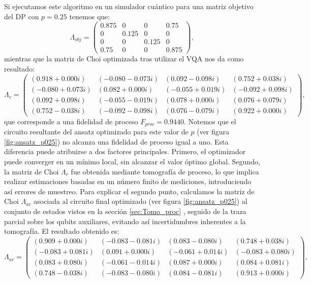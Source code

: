 \documentclass[letterpaper,12pt]{thesisECFM}
\theoremstyle{plain}
\theoremstyle{definition}
\theoremstyle{definition}
\theoremstyle{remark}
\newcommand{\1}{\mathbb{1}}
\begin{document}
Si ejecutamos este algoritmo en un simulador cuántico para una matriz objetivo del DP con $p=0.25$ tenemos que:
\begin{equation}
    \Lambda_{obj} = \begin{pmatrix}
0.875 & 0 & 0 & 0.75 \\
0 & 0.125 & 0 & 0 \\
0 & 0 & 0.125 & 0 \\
0.75 & 0 & 0 & 0.875
\end{pmatrix},
\end{equation}
mientras que la matriz de Choi optimizada tras utilizar el VQA nos da como
resultado:  
\begin{equation}
  \Lambda_r =  \begin{pmatrix}
(0.918 + 0.000i) & (-0.080 - 0.073i) & (0.092 - 0.098i) & (0.752 + 0.038i) \\
(-0.080 + 0.073i) & (0.082 + 0.000i) & (-0.055 + 0.019i) & (-0.092 + 0.098i) \\
(0.092 + 0.098i) & (-0.055 - 0.019i) & (0.078 + 0.000i) & (0.076 + 0.079i) \\
(0.752 - 0.038i) & (-0.092 - 0.098i) & (0.076 - 0.079i) & (0.922 + 0.000i)
\end{pmatrix},
\end{equation}
que corresponde a una fidelidad de proceso $F_{proc}= 0.9440$. Notemos que el
circuito resultante del ansatz optimizado para este valor de $p$ (ver figura
\ref{fig:ansatz_p025}) no alcanza una fidelidad de proceso igual a uno. Esta diferencia puede atribuirse a dos factores principales. Primero, el optimizador puede converger en un mínimo local, sin alcanzar el valor óptimo global. Segundo, la matriz de Choi $\Lambda_r$ fue obtenida mediante tomografía de proceso, lo que implica realizar estimaciones basadas en un número finito de mediciones, introduciendo así errores de muestreo. Para explicar el segundo punto, calculamos la matriz de Choi $\Lambda_{ar}$ asociada al circuito final optimizado (ver figura \ref{fig:ansatz_p025}) al conjunto de estados vistos en la sección \ref{sec:Tomo_proc} , seguido de la traza parcial sobre los qubits auxiliares, evitando así incertidumbres inherentes a la tomografía. El resultado obtenido es:  
\begin{equation}
    \Lambda_{ar} =  \begin{pmatrix}
(0.909 + 0.000i) & (-0.083 - 0.081i) & (0.083 - 0.080i) & (0.748 + 0.038i) \\
(-0.083 + 0.081i) & (0.091 + 0.000i) & (-0.061 + 0.014i) & (-0.083 + 0.080i) \\
(0.083 + 0.080i) & (-0.061 - 0.014i) & (0.087 + 0.000i) & (0.084 + 0.081i) \\
(0.748 - 0.038i) & (-0.083 - 0.080i) & (0.084 - 0.081i) & (0.913 + 0.000i)
\end{pmatrix},
\end{equation}
\end{document}
